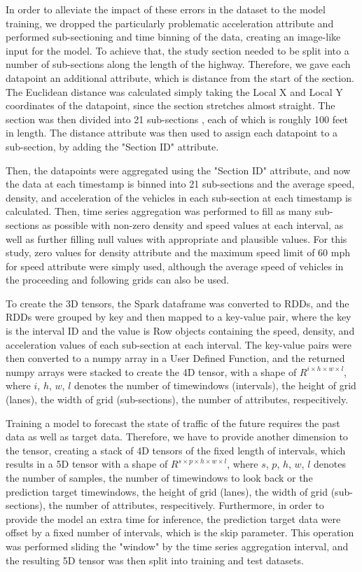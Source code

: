 \documentclass[11pt]{uonthesis}
\begin{document}
In order to alleviate the impact of these errors in the dataset to the model training, we dropped the particularly problematic acceleration attribute and performed sub-sectioning and time binning of the data, creating an image-like input for the model. To achieve that, the study section needed to be split into a number of sub-sections along the length of the highway. Therefore, we gave each datapoint an additional attribute, which is distance from the start of the section. The Euclidean distance was calculated simply taking the Local X and Local Y coordinates of the datapoint, since the section stretches almost straight. The section was then divided into 21 sub-sections %
, each of which is roughly 100 feet in length. The distance attribute was then used to assign each datapoint to a sub-section, by adding the "Section ID" attribute.

Then, the datapoints were aggregated using the "Section ID" attribute, and now the data at each timestamp is binned into 21 sub-sections and the average speed, density, and acceleration of the vehicles in each sub-section at each timestamp is calculated. Then, time series aggregation was performed to fill as many sub-sections as possible with non-zero density and speed values at each interval, as well as further filling null values with appropriate and plausible values. For this study, zero values for density attribute and the maximum speed limit of 60 mph for speed attribute were simply used, although the average speed of vehicles in the proceeding and following grids can also be used. 

To create the 3D tensors, the Spark dataframe was converted to RDDs, and the RDDs were grouped by key and then mapped to a key-value pair, where the key is the interval ID and the value is Row objects containing the speed, density, and acceleration values of each sub-section at each interval. The key-value pairs were then converted to a numpy array in a User Defined Function, and the returned numpy arrays were stacked to create the 4D tensor, with a shape of $R^{i{\times}h{\times}w{\times}l}$, where $i$, $h$, $w$, $l$ denotes the number of timewindows (intervals), the height of grid (lanes), the width of grid (sub-sections), the number of attributes, respecitively. %

Training a model to forecast the state of traffic of the future requires the past data as well as target data. Therefore, we have to provide another dimension to the tensor, creating a stack of 4D tensors of the fixed length of intervals, which results in a 5D tensor with a shape of $R^{s{\times}p{\times}h{\times}w{\times}l}$, where $s$, $p$, $h$, $w$, $l$ denotes the number of samples, the number of timewindows to look back or the prediction target timewindows, the height of grid (lanes), the width of grid (sub-sections), the number of attributes, respecitively. Furthermore, in order to provide the model an extra time for inference, the prediction target data were offset by a fixed number of intervals, which is the skip parameter. This operation was performed sliding the "window" by the time series aggregation interval, and the resulting 5D tensor was then split into training and test datasets. %
\end{document}
